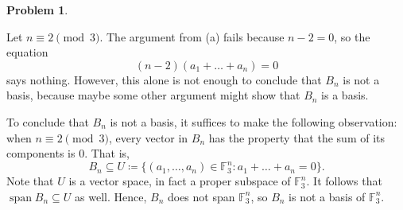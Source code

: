 \documentclass[11pt,oneside]{amsart}
\theoremstyle{definition}
\newtheorem{problem}{Problem}
\newcommand{\bF}{\mathbb{F}}
\DeclareMathOperator{\Span}{span}
\begin{document}
\begin{problem}
\begin{enumerate}[(a)]
\begin{solution}
                Let $n\equiv 2\pmod 3$. The argument from (a) fails because $n-2=0$, so the equation 
                \[(n-2)(a_1+\dots+a_n)=0\]
                says nothing. However, this alone is not enough to conclude that $B_n$ is not a basis, because maybe some other argument might show that $B_n$ is a basis.

                To conclude that $B_n$ is not a basis, it suffices to make the following observation: when $n\equiv 2\pmod 3$, every vector in $B_n$ has the property that the sum of its components is 0. That is,
                \[B_n\subseteq U\coloneqq\{(a_1,\dots,a_n)\in\bF_3^n:a_1+\dots+a_n=0\}.\]
                Note that $U$ is a vector space, in fact a proper subspace of $\bF_3^n$. It follows that $\Span B_n\subseteq U$ as well. Hence, $B_n$ does not span $\bF_3^n$, so $B_n$ is not a basis of $\bF_3^n$.
            \end{solution}
        \end{enumerate}
    \end{problem}
\end{document}
